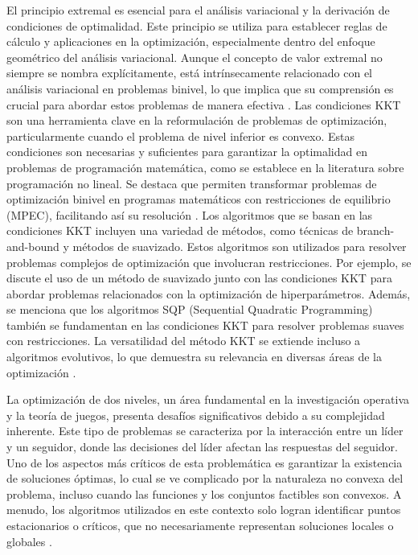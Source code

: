 El principio extremal es esencial para el análisis variacional y la derivación de condiciones de optimalidad. Este principio se utiliza para establecer reglas de cálculo y aplicaciones en la optimización, especialmente dentro del enfoque geométrico del análisis variacional. Aunque el concepto de valor extremal no siempre se nombra explícitamente, está intrínsecamente relacionado con el análisis variacional en problemas binivel, lo que implica que su comprensión es crucial para abordar estos problemas de manera efectiva \cite{DempeyZemkoho2020}. Las condiciones KKT son una herramienta clave en la reformulación de problemas de optimización, particularmente cuando el problema de nivel inferior es convexo. Estas condiciones son necesarias y suficientes para garantizar la optimalidad en problemas de programación matemática, como se establece en la literatura sobre programación no lineal. Se destaca que permiten transformar problemas de optimización binivel en programas matemáticos con restricciones de equilibrio (MPEC), facilitando así su resolución \cite{DempeyZemkoho2020}.
Los algoritmos que se basan en las condiciones KKT incluyen una variedad de métodos, como técnicas de branch-and-bound y métodos de suavizado. Estos algoritmos son utilizados para resolver problemas complejos de optimización que involucran restricciones. Por ejemplo, se discute el uso de un método de suavizado junto con las condiciones KKT para abordar problemas relacionados con la optimización de hiperparámetros. Además, se menciona que los algoritmos SQP (Sequential Quadratic Programming) también se fundamentan en las condiciones KKT para resolver problemas suaves con restricciones. La versatilidad del método KKT se extiende incluso a algoritmos evolutivos, lo que demuestra su relevancia en diversas áreas de la optimización \cite{DempeyZemkoho2020}.

La optimización de dos niveles, un área fundamental en la investigación operativa y la teoría de juegos, presenta desafíos significativos debido a su complejidad inherente. Este tipo de problemas se caracteriza por la interacción entre un líder y un seguidor, donde las decisiones del líder afectan las respuestas del seguidor. Uno de los aspectos más críticos de esta problemática es garantizar la existencia de soluciones óptimas, lo cual se ve complicado por la naturaleza no convexa del problema, incluso cuando las funciones y los conjuntos factibles son convexos. A menudo, los algoritmos utilizados en este contexto solo logran identificar puntos estacionarios o críticos, que no necesariamente representan soluciones locales o globales \cite{DempeyZemkoho2020}.

